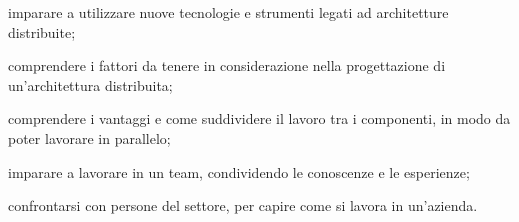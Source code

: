 \begin{list}{*}{}
    \item imparare a utilizzare nuove tecnologie e strumenti legati ad architetture distribuite;
    \item comprendere i fattori da tenere in considerazione nella progettazione di un'architettura distribuita;
    \item comprendere i vantaggi e come suddividere il lavoro tra i componenti, in modo da poter lavorare in parallelo;
    \item imparare a lavorare in un team, condividendo le conoscenze e le esperienze;
    \item confrontarsi con persone del settore, per capire come si lavora in un'azienda.
\end{list}

\newpage
\pagestyle{empty}
\null %

\newpage